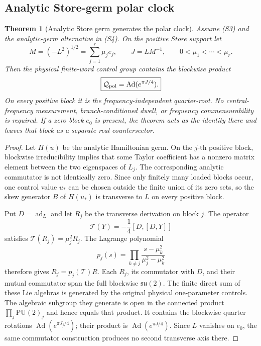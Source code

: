 \documentclass[11pt]{article}
\newtheorem{theorem}{Theorem}[section]
\theoremstyle{definition}
\theoremstyle{remark}
\begin{document}
\subsection{Analytic Store-germ polar clock}

\begin{theorem}[Analytic Store germ generates the polar clock]
\label{thm:analytic-store-polar-master}
Assume \textup{(S3)} and the analytic-germ
alternative in \textup{(S4)}.  On the positive
Store support let
\[
  M=(-L^2)^{1/2}=\sum_{j=1}^{r}\mu_je_j,
  \qquad
  J=LM^{-1},
  \qquad 0<\mu_1<\cdots<\mu_r.
\]
Then the physical finite-word control group contains the blockwise product
\[
  \boxed{\mathcal Q_{\rm pol}=\operatorname{Ad}(e^{\pi J/4}).}
\]
On every positive block it is the frequency-independent quarter-root.  No
central-frequency measurement, branch-conditioned dwell, or frequency
commensurability is required.  If a zero block $e_0$ is present, the theorem
acts as the identity there and leaves that block as a separate real
countersector.
\end{theorem}

\begin{proof}
Let $H(u)$ be the analytic Hamiltonian germ.  On the $j$-th positive block,
blockwise irreducibility implies that some Taylor coefficient has a nonzero
matrix element between the two eigenspaces of $L_j$.  The corresponding
analytic commutator is not identically zero.  Since only finitely many loaded
blocks occur, one control value $u_*$ can be chosen outside the finite union of
its zero sets, so the skew generator $B$ of $H(u_*)$ is transverse to $L$ on
every positive block.

Put $D=\operatorname{ad}_L$ and let $R_j$ be the transverse derivation on block
$j$.  The operator
\[
  \mathscr T(Y)=-\frac14[D,[D,Y]]
\]
satisfies $\mathscr T(R_j)=\mu_j^2R_j$.  The Lagrange polynomial
\[
  p_j(s)=\prod_{k\ne j}\frac{s-\mu_k^2}{\mu_j^2-\mu_k^2}
\]
therefore gives $R_j=p_j(\mathscr T)R$.  Each $R_j$, its commutator with $D$,
and their mutual commutator span the full blockwise $\mathfrak{su}(2)$.  The
finite direct sum of these Lie algebras is generated by the original physical
one-parameter controls.  The algebraic subgroup they generate is open in the
connected product $\prod_j\mathrm{PU}(2)_j$ and hence equals that product.
It contains the blockwise quarter rotations
$\operatorname{Ad}(e^{\pi J_j/4})$; their product is
$\operatorname{Ad}(e^{\pi J/4})$.  Since $L$ vanishes on $e_0$, the same
commutator construction produces no second transverse axis there.
\end{proof}
\end{document}
